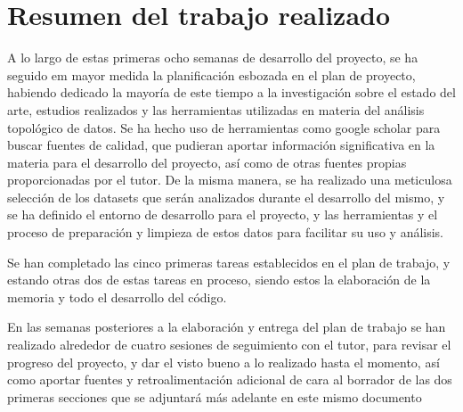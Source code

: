 \chapter{Resumen del trabajo realizado} \label{chp:abstract}

A lo largo de estas primeras ocho semanas de desarrollo del proyecto, se ha seguido em mayor medida la planificación esbozada en el plan de proyecto, habiendo dedicado la mayoría de este tiempo a la investigación sobre el estado del arte, estudios realizados y las herramientas utilizadas en materia del análisis topológico de datos. Se ha hecho uso de herramientas como google scholar para buscar fuentes de calidad, que pudieran aportar información significativa en la materia para el desarrollo del proyecto, así como de otras fuentes propias proporcionadas por el tutor. De la misma manera, se ha realizado una meticulosa selección de los datasets que serán analizados durante el desarrollo del mismo, y se ha definido el entorno de desarrollo para el proyecto, y las herramientas y el proceso de preparación y limpieza de estos datos para facilitar su uso y análisis.

\vspace{0.2cm}

Se han completado las cinco primeras tareas establecidos en el plan de trabajo, y estando otras dos de estas tareas en proceso, siendo estos la elaboración de la memoria y todo el desarrollo del código. 

\vspace{0.2cm}

En las semanas posteriores a la elaboración y entrega del plan de trabajo se han realizado alrededor de cuatro sesiones de seguimiento con el tutor, para revisar el progreso del proyecto, y dar el visto bueno a lo realizado hasta el momento, así como aportar fuentes y retroalimentación adicional de cara al borrador de las dos primeras secciones que se adjuntará más adelante en este mismo documento
